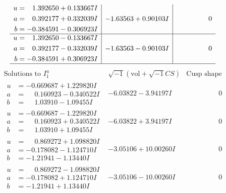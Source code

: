 \documentclass[1p]{elsarticle_modified}
\theoremstyle{definition}
\newcommand{\I}{\sqrt{-1}}
\begin{document}
$$\begin{array}{c|c|c}
\begin{aligned}
u &= \phantom{-}1.392650 + 0.133667 I \\
a &= \phantom{-}0.392177 + 0.332039 I \\
b &= -0.384591 - 0.306923 I\end{aligned}
 & -1.63563 + 0.90103 I & \phantom{-0.000000 } 0 \\ \hline\begin{aligned}
u &= \phantom{-}1.392650 - 0.133667 I \\
a &= \phantom{-}0.392177 - 0.332039 I \\
b &= -0.384591 + 0.306923 I\end{aligned}
 & -1.63563 - 0.90103 I & \phantom{-0.000000 } 0\\
 \hline 
 \end{array}$$\newpage$$\begin{array}{c|c|c}  
\text{Solutions to }I^u_{1}& \I (\text{vol} + \sqrt{-1}CS) & \text{Cusp shape}\\
 \hline 
\begin{aligned}
u &= -0.669687 + 1.229820 I \\
a &= \phantom{-}0.160923 - 0.340522 I \\
b &= \phantom{-}1.03910 - 1.09455 I\end{aligned}
 & -6.03822 - 3.94197 I & \phantom{-0.000000 } 0 \\ \hline\begin{aligned}
u &= -0.669687 - 1.229820 I \\
a &= \phantom{-}0.160923 + 0.340522 I \\
b &= \phantom{-}1.03910 + 1.09455 I\end{aligned}
 & -6.03822 + 3.94197 I & \phantom{-0.000000 } 0 \\ \hline\begin{aligned}
u &= \phantom{-}0.869272 + 1.098820 I \\
a &= -0.178082 - 1.124710 I \\
b &= -1.21941 - 1.13440 I\end{aligned}
 & -3.05106 + 10.00260 I & \phantom{-0.000000 } 0 \\ \hline\begin{aligned}
u &= \phantom{-}0.869272 - 1.098820 I \\
a &= -0.178082 + 1.124710 I \\
b &= -1.21941 + 1.13440 I\end{aligned}
 & -3.05106 - 10.00260 I & \phantom{-0.000000 } 0 \\ \hline\begin{aligned}

\end{aligned}
\end{array}$$
\end{document}
